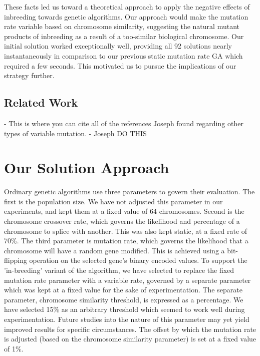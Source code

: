\documentclass{sig-alternate}
\begin{document}
These facts led us toward a theoretical approach to apply the negative effects of inbreeding towards genetic algorithms. Our approach would make the mutation rate variable based on chromosome similarity, suggesting the natural mutant products of inbreeding as a result of a too-similar biological chromosome. Our initial solution worked exceptionally well, providing all 92 solutions nearly instantaneously in comparison to our previous static mutation rate GA which required a few seconds. This motivated us to pursue the implications of our strategy further.

\subsection{Related Work}

- This is where you can cite all of the references Joseph found regarding other types of variable mutation.
- Joseph DO THIS




% 
%
\section{Our Solution Approach}
Ordinary genetic algorithms use three parameters to govern their evaluation. The first is the population size. We have not adjusted this parameter in our experiments, and kept them at a fixed value of 64 chromosomes. Second is the chromosome crossover rate, which governs the likelihood and percentage of a chromosome to splice with another. This was also kept static, at a fixed rate of 70\%. The third parameter is mutation rate, which governs the likelihood that a chromosome will have a random gene modified. This is achieved using a bit-flipping operation on the selected gene's binary encoded values. To support the 'in-breeding' variant of the algorithm, we have selected to replace the fixed mutation rate parameter with a variable rate, governed by a separate parameter which was kept at a fixed value for the sake of experimentation. The separate parameter, chromosome similarity threshold, is expressed as a percentage. We have selected 15\% as an arbitrary threshold which seemed to work well during experimentation. Future studies into the nature of this parameter may yet yield improved results for specific circumstances. The offset by which the mutation rate is adjusted (based on the chromosome similarity parameter) is set at a fixed value of 1\%.
\end{document}
